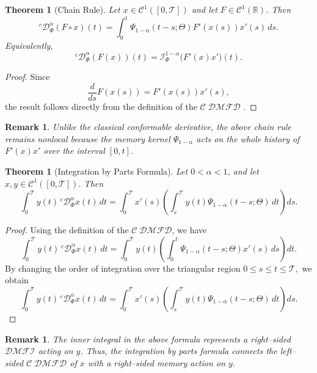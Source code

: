 \documentclass[11pt]{article}
\numberwithin{equation}{section}
\newtheorem{theorem}[definition]{Theorem}
\newtheorem{remark}[definition]{Remark}
\begin{document}

\begin{theorem}[Chain Rule]
Let $x\in \mathcal{C}^1([0,\mathcal{T}])$ and let $F\in \mathcal{C}^1(\mathbb R)$. Then
\[
{}^c\mathcal D_\Phi^\alpha(F\circ x)(t)
=
\int_0^t
\Psi_{1-\alpha}(t-s;\Theta)
F'(x(s))x'(s)\,ds.
\]
Equivalently,
\[
{}^c\mathcal D_\Phi^\alpha(F(x))(t)
=
\mathcal I_\Phi^{1-\alpha}
\big(F'(x)x'\big)(t).
\]
\end{theorem}

\begin{proof}
Since
\[
\frac{d}{ds}F(x(s))
=
F'(x(s))x'(s),
\]
the result follows directly from the definition of the $\mathcal{C\;DMFD}$ .
\end{proof}


\begin{remark}
Unlike the classical conformable derivative, the above chain rule remains nonlocal because the memory kernel $\Psi_{1-\alpha}$ acts on the whole history of $F'(x)x'$ over the interval $[0,t]$.
\end{remark}

\begin{theorem}[Integration by Parts Formula]
Let \(0<\alpha<1\), and let \(x,y\in \mathcal{C}^{1}([0,\mathcal{T}])\). Then
\[
\int_{0}^{\mathcal{T}} y(t)\,{}^{c}\mathcal D_{\Phi}^{\alpha}x(t)\,dt
=
\int_{0}^{\mathcal{T}} x'(s)
\left(
\int_{s}^{\mathcal{T}} y(t)\Psi_{1-\alpha}(t-s;\Theta)\,dt
\right)ds.
\]
\end{theorem}

\begin{proof}
Using the definition of the $\mathcal{C\;DMFD}$, we have
\[
\int_{0}^{\mathcal{T}} y(t)\,{}^{c}\mathcal D_{\Phi}^{\alpha}x(t)\,dt
=
\int_{0}^{\mathcal{T}} y(t)
\left(
\int_{0}^{t}\Psi_{1-\alpha}(t-s;\Theta)x'(s)\,ds
\right)dt.
\]
By changing the order of integration over the triangular region
\(
0\leq s\leq t\leq \mathcal{T},
\)
we obtain
\[
\int_{0}^{\mathcal{T}} y(t)\,{}^{c}\mathcal D_{\Phi}^{\alpha}x(t)\,dt
=
\int_{0}^{\mathcal{T}} x'(s)
\left(
\int_{s}^{\mathcal{T}} y(t)\Psi_{1-\alpha}(t-s;\Theta)\,dt
\right)ds.
\]
\end{proof}

\begin{remark}
The inner integral in the above formula represents a right--sided $\mathcal{DMFI}$ acting on \(y\). Thus, the integration by parts formula connects the left--sided $\mathcal{C\;DMFD}$ of \(x\) with a right--sided memory action on \(y\).
\end{remark}
\end{document}
